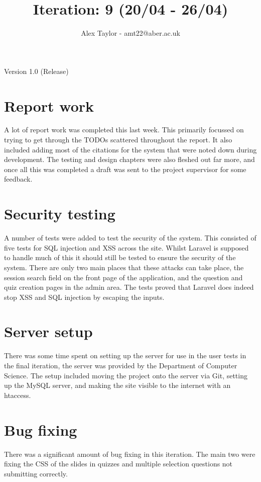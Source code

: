 \documentclass{article}
\title{Iteration: 9 (20/04 - 26/04)}
\author{Alex Taylor - amt22@aber.ac.uk}
\begin{document}
\maketitle
\begin{center}
	Version 1.0 (Release)
\end{center}
\tableofcontents
\thispagestyle{empty}
\newpage

\section{Report work}
A lot of report work was completed this last week. This primarily focussed on trying to get through the TODOs scattered throughout the report. It also included adding most of the citations for the system that were noted down during development. The testing and design chapters were also fleshed out far more, and once all this was completed a draft was sent to the project supervisor for some feedback.

\section{Security testing}
A number of tests were added to test the security of the system. This consisted of five tests for SQL injection and XSS across the site. Whilst Laravel is supposed to handle much of this it should still be tested to ensure the security of the system. There are only two main places that these attacks can take place, the session search field on the front page of the application, and the question and quiz creation pages in the admin area. The tests proved that Laravel does indeed stop XSS and SQL injection by escaping the inputs.

\section{Server setup}
There was some time spent on setting up the server for use in the user tests in the final iteration, the server was provided by the Department of Computer Science. The setup included moving the project onto the server via Git, setting up the MySQL server, and making the site visible to the internet with an htaccess.
\newpage

\section{Bug fixing}
There was a significant amount of bug fixing in this iteration. The main two were fixing the CSS of the slides in quizzes and multiple selection questions not submitting correctly. 
\end{document}
